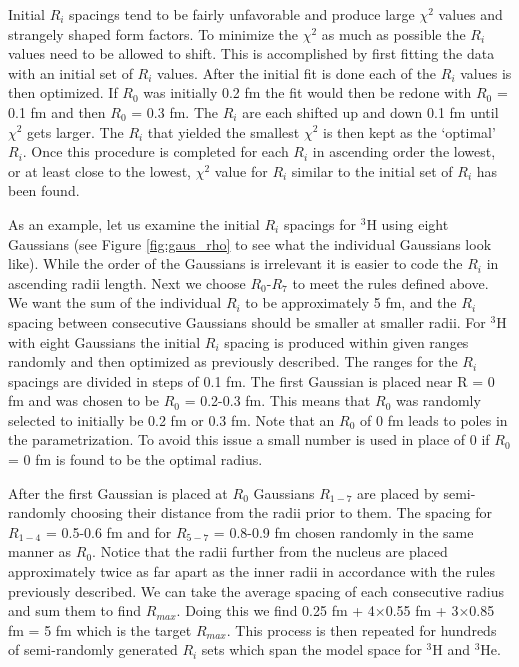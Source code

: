 Initial $R_i$ spacings tend to be fairly unfavorable and produce large $\chi^2$ values and strangely shaped form factors. To minimize the $\chi^2$ as much as possible the $R_i$ values need to be allowed to shift. This is accomplished by first fitting the data with an initial set of $R_i$ values. After the initial fit is done each of the $R_i$ values is then optimized. If $R_0$ was initially 0.2 fm the fit would then be redone with $R_0$ = 0.1 fm and then $R_0$ = 0.3 fm. The $R_i$ are each shifted up and down 0.1 fm until $\chi^2$ gets larger. The $R_i$ that yielded the smallest $\chi^2$ is then kept as the `optimal' $R_i$. Once this procedure is completed for each $R_i$ in ascending order the lowest, or at least close to the lowest, $\chi^2$ value for $R_i$ similar to the initial set of $R_i$ has been found.  

As an example, let us examine the initial $R_i$ spacings for $^3$H using eight Gaussians (see Figure \ref{fig:gaus_rho} to see what the individual Gaussians look like). While the order of the Gaussians is irrelevant it is easier to code the $R_i$ in ascending radii length. Next we choose $R_0$-$R_7$ to meet the rules defined above. We want the sum of the individual $R_i$ to be approximately 5 fm, and the $R_i$ spacing between consecutive Gaussians should be smaller at smaller radii. For $^3$H with eight Gaussians the initial $R_i$ spacing is produced within given ranges randomly and then optimized as previously described. The ranges for the $R_i$ spacings are divided in steps of 0.1 fm. The first Gaussian is placed near R = 0 fm and was chosen to be $R_0$ = 0.2-0.3 fm. This means that $R_0$ was randomly selected to initially be 0.2 fm or 0.3 fm. Note that an $R_0$ of 0 fm leads to poles in the parametrization. To avoid this issue a small number is used in place of 0 if $R_0$ = 0 fm is found to be the optimal radius. 

After the first Gaussian is placed at $R_0$ Gaussians $R_{1-7}$ are placed by semi-randomly choosing their distance from the radii prior to them. The spacing for $R_{1-4}$ = 0.5-0.6 fm and for $R_{5-7}$ = 0.8-0.9 fm chosen randomly in the same manner as $R_0$. Notice that the radii further from the nucleus are placed approximately twice as far apart as the inner radii in accordance with the rules previously described. We can take the average spacing of each consecutive radius and sum them to find $R_{max}$. Doing this we find 0.25 fm + 4$\times$0.55 fm + 3$\times$0.85 fm = 5 fm which is the target $R_{max}$. This process is then repeated for hundreds of semi-randomly generated $R_i$ sets which span the model space for $^3$H and $^3$He. 

